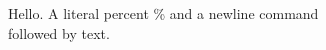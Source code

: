 \documentclass{article}
\begin{document}
Hello. %
A literal percent \% and a newline command \\ followed by text.
\end{document}
